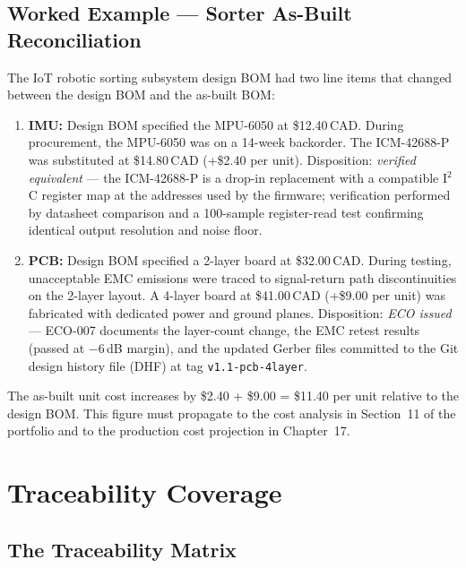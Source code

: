 \subsection{Worked Example --- Sorter As-Built Reconciliation}
\label{sec:ch16-asbuilt-worked}

The IoT robotic sorting subsystem design BOM had two line items that changed
between the design BOM and the as-built BOM:

\begin{enumerate}
  \item[(a)] \textbf{IMU:} Design BOM specified the MPU-6050 at \$12.40\,CAD.
        During procurement, the MPU-6050 was on a 14-week backorder.
        The ICM-42688-P was substituted at \$14.80\,CAD (+\$2.40 per unit).
        Disposition: \emph{verified equivalent} --- the ICM-42688-P is a
        drop-in replacement with a compatible I$^2$C register map at the
        addresses used by the firmware; verification performed by datasheet
        comparison and a 100-sample register-read test confirming identical
        output resolution and noise floor.

  \item[(b)] \textbf{PCB:} Design BOM specified a 2-layer board at \$32.00\,CAD.
        During testing, unacceptable EMC emissions were traced to signal-return
        path discontinuities on the 2-layer layout.
        A 4-layer board at \$41.00\,CAD (+\$9.00 per unit) was fabricated with
        dedicated power and ground planes.
        Disposition: \emph{ECO issued} --- ECO-007 documents the layer-count
        change, the EMC retest results (passed at $-6$\,dB margin), and the
        updated Gerber files committed to the Git design history file (DHF) at
        tag \texttt{v1.1-pcb-4layer}.
\end{enumerate}

The as-built unit cost increases by \$2.40 + \$9.00 = \$11.40 per unit relative
to the design BOM.
This figure must propagate to the cost analysis in Section~11 of the portfolio
and to the production cost projection in Chapter~17.

\section{Traceability Coverage}
\label{sec:ch16-traceability}

\subsection{The Traceability Matrix}
\label{sec:ch16-matrix}

